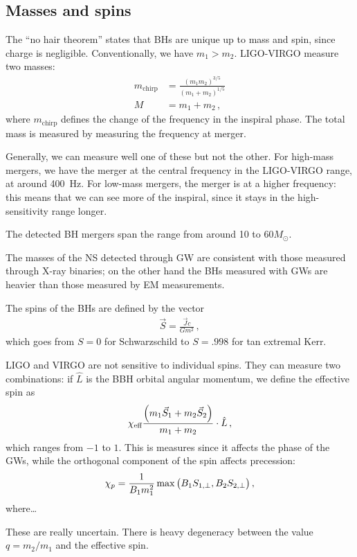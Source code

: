\documentclass[main.tex]{subfiles}
\begin{document}
\subsection{Masses and spins}
The ``no hair theorem'' states that BHs are unique up to mass and spin, since charge is negligible. 
Conventionally, we have \(m_1 > m_2 \). 
LIGO-VIRGO measure two masses: 
%
\begin{align}
m _{\text{chirp}} &= \frac{(m_1 m_2 )^{3/5}}{(m_1 + m_2 )^{1/5}}  \\
M &= m_1 + m_2 
\,,
\end{align}
%
where \(m _{\text{chirp}}\) defines the change of the frequency in the inspiral phase. 
The total mass is measured by measuring the frequency at merger. 

Generally, we can measure well one of these but not the other. 
For high-mass mergers, we have the merger at the central frequency in the LIGO-VIRGO range, at around \SI{400}{Hz}. 
For low-mass mergers, the merger is at a higher frequency: this means that we can see more of the inspiral, since it stays in the high-sensitivity range longer. 

The detected BH mergers span the range from around 10 to \(60M_{\odot}\). 

The masses of the NS detected through GW are consistent with those measured through X-ray binaries; on the other hand the BHs measured with GWs are heavier than those measured by EM measurements. 

The spins of the BHs are defined by the vector 
%
\begin{align}
\vec{S} = \frac{\vec{J} c}{G m^2}
\,,
\end{align}
%
which goes from \(S = 0\) for Schwarzschild to \(S = \num{.998}\) for tan extremal Kerr. 

LIGO and VIRGO are not sensitive to individual spins. They can measure two combinations: if \(\hat{L}\) is the BBH orbital angular momentum, we define the effective spin as 
%
\begin{align}
\chi _{\text{eff}} \frac{\qty(m_1 \vec{S}_{1} + m_2 \vec{S}_{2})}{m_1 + m_2 } \cdot \hat{L}
\,,
\end{align}
%
which ranges from \(-1\) to \(1\). 
This is measures since it affects the phase of the GWs, while the orthogonal component of the spin affects precession: 
%
\begin{align}
\chi_{p} = \frac{1}{B_1 m_1^2} \max \qty(B_1 S_{1, \perp}, B_2 S_{2, \perp})
\,,
\end{align}
%
where\dots

These are really uncertain. 
There is heavy degeneracy between the value \(q = m_2 / m_1 \) and the effective spin. 

\end{document}
